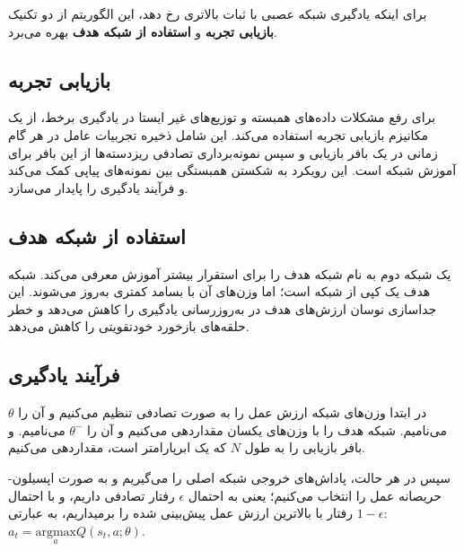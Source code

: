 برای اینکه یادگیری شبکه عصبی با ثبات بالاتری رخ دهد، این الگوریتم از دو تکنیک 
\textbf{بازیابی تجربه}\cite{fedus2020revisiting}
و
\textbf{استفاده از شبکه هدف}
بهره می‌برد.
\subsection{بازیابی تجربه}
برای رفع مشکلات داده‌های همبسته و توزیع‌های غیر ایستا در یادگیری برخط،  از یک مکانیزم بازیابی تجربه استفاده می‌کند. این شامل ذخیره تجربیات عامل در هر گام زمانی در یک بافر بازیابی و سپس نمونه‌برداری تصادفی ریزدسته‌ها
 از این بافر برای آموزش شبکه است. این رویکرد به شکستن همبستگی بین نمونه‌های پیاپی کمک می‌کند و فرآیند یادگیری را پایدار می‌سازد.
\subsection{استفاده از شبکه هدف}
 یک شبکه دوم به نام شبکه هدف را برای استقرار بیشتر آموزش معرفی می‌کند. شبکه هدف یک کپی از شبکه 
  است؛ اما وزن‌های آن با بسامد کمتری به‌روز می‌شوند. این جداسازی نوسان ارزش‌های هدف در به‌روزرسانی یادگیری 
   را کاهش می‌دهد و خطر حلقه‌های بازخورد خودتقویتی
    را کاهش می‌دهد.
\subsection{فرآیند یادگیری}
در ابتدا وزن‌های شبکه ارزش عمل را به صورت تصادفی تنظیم می‌کنیم و آن را $\theta$ می‌نامیم.
 شبکه هدف را با وزن‌های یکسان مقداردهی می‌کنیم و آن را $\theta^-$ می‌نامیم.
و بافر بازیابی را
به طول $N$ که یک ابرپارامتر
 است، مقداردهی می‌کنیم.

سپس در هر حالت، پاداش‌های خروجی شبکه اصلی را می‌گیریم و به صورت اپسیلون-حریصانه عمل را انتخاب می‌کنیم؛
یعنی به احتمال $\epsilon$ رفتار تصادفی داریم، 
و با احتمال $1-\epsilon$
رفتار با بالاترین ارزش عمل پیش‌بینی شده را برمیداریم، به عبارتی: $a_t = \underset{a}{\mathrm{argmax}} Q(s_t, a; \theta)$.

